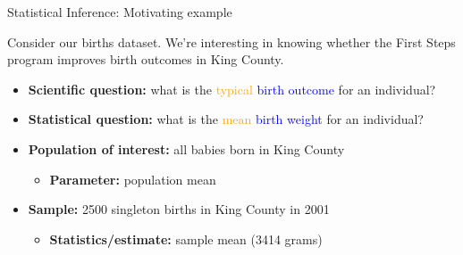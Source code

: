 \documentclass[10pt,t]{beamer}
\begin{document}
\begin{frame}{Statistical Inference: Motivating example}

Consider our births dataset. We're interesting in knowing whether the First Steps program improves birth outcomes in King County.

\vspace{0.1cm}

\begin{itemize}
	\item \textbf{Scientific question:} what is the \textcolor{orange}{typical}  \textcolor{blue}{birth outcome} for an individual?
	\item \textbf{Statistical question:} what is the \textcolor{orange}{mean} \textcolor{blue}{birth weight} for an individual?
	\item \textbf{Population of interest:} all babies born in King County
	\begin{itemize}
		\item \textbf{Parameter:} population mean
	\end{itemize}
	\item \textbf{Sample:} 2500 singleton births in King County in 2001
	\begin{itemize}
		\item \textbf{Statistics/estimate:} sample mean (3414 grams)
	\end{itemize}
\end{itemize}

\end{frame}
\end{document}
